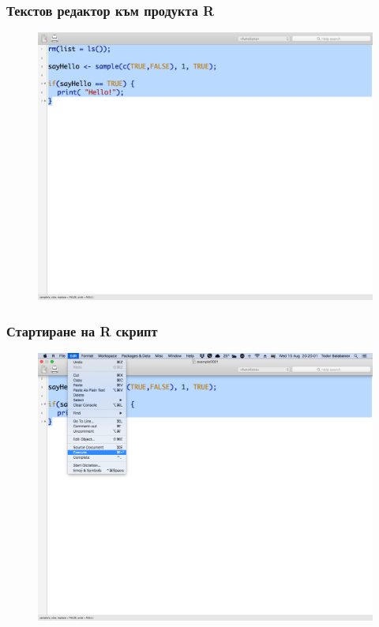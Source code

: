 \documentclass{beamer}
\begin{document}
\begin{frame}
\frametitle{Текстов редактор към продукта R}
\begin{figure}[]\includegraphics[width=\textwidth,height=0.75\textheight]{pic0025}\end{figure}
\end{frame}

\begin{frame}
\frametitle{Стартиране на R скрипт}
\begin{figure}[]\includegraphics[width=\textwidth,height=0.75\textheight]{pic0026}\end{figure}
\end{frame}
\end{document}
